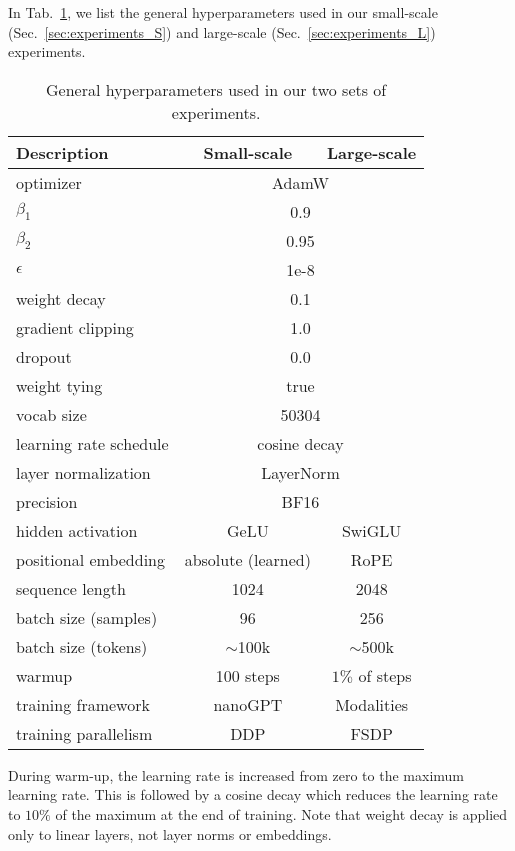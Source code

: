 In Tab.~\ref{tab:model_architecture}, we list the general hyperparameters used in our small-scale (Sec.~\ref{sec:experiments_S}) and large-scale (Sec.~\ref{sec:experiments_L}) experiments. 
\begin{table}[ht]
\centering
\scriptsize
\begin{tabular}{l|cc}
\toprule
Description & Small-scale & Large-scale \\ 
\midrule
optimizer & \multicolumn{2}{c}{AdamW} \\ 
$\beta_1$ & \multicolumn{2}{c}{0.9} \\
$\beta_2$ & \multicolumn{2}{c}{0.95} \\
$\epsilon$ & \multicolumn{2}{c}{1e-8} \\
weight decay & \multicolumn{2}{c}{0.1} \\
gradient clipping & \multicolumn{2}{c}{1.0} \\
dropout & \multicolumn{2}{c}{0.0} \\
weight tying & \multicolumn{2}{c}{true} \\
vocab size & \multicolumn{2}{c}{50304} \\
learning rate schedule & \multicolumn{2}{c}{cosine decay} \\
layer normalization & \multicolumn{2}{c}{LayerNorm} \\
precision & \multicolumn{2}{c}{BF16} \\
\midrule
hidden activation & GeLU & SwiGLU \\
positional embedding & absolute (learned) & RoPE \\ 
sequence length & 1024 & 2048 \\
batch size (samples) & 96 & 256 \\
batch size (tokens) & $\sim$100k & $\sim$500k \\
warmup & 100 steps & $1\%$ of steps \\
training framework & nanoGPT & Modalities \\
training parallelism & DDP & FSDP \\
\bottomrule 
\end{tabular}
\caption{General hyperparameters used in our two sets of experiments.}
\label{tab:model_architecture}
\end{table}
During warm-up, the learning rate is increased from zero to the maximum learning rate. This is followed by a cosine decay which reduces the learning rate to $10\%$ of the maximum at the end of training. Note that weight decay is applied only to linear layers, not layer norms or embeddings.
